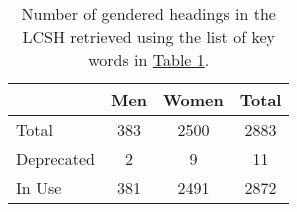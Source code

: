 \begin{table}
	\caption{Number of gendered headings in the LCSH retrieved using the list of key words in \hyperref[tab:gendered-words]{Table 1}.}
	\begin{center}
		\begin{tabular}{lccc}
			\toprule
			 & Men & Women & Total \\
			\midrule
			Total & 383 & 2500 & 2883 \\
			Deprecated & 2 & 9 & 11 \\
			In Use & 381 & 2491 & 2872 \\
			\bottomrule
		\end{tabular}
	\end{center}
	\label{tab:term-counts}
\end{table}